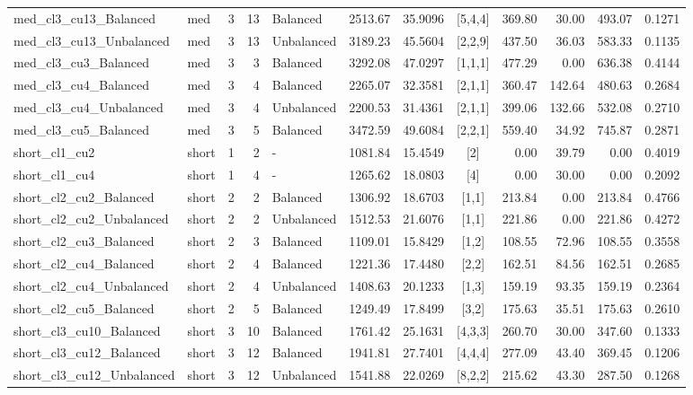 \documentclass[trsc,dblanonrev]{informs4}
\begin{document}
\begin{APPENDICES}
\begin{table}
{{\begin{tabular}{@{}l l r r l r r c r r r r@{}}
med\_cl3\_cu13\_Balanced & med & 3 & 13 & Balanced & 2513.67 & 35.9096 & [5,4,4] & 369.80 & 30.00 & 493.07 & 0.1271 \\
med\_cl3\_cu13\_Unbalanced & med & 3 & 13 & Unbalanced & 3189.23 & 45.5604 & [2,2,9] & 437.50 & 36.03 & 583.33 & 0.1135 \\
med\_cl3\_cu3\_Balanced & med & 3 & 3 & Balanced & 3292.08 & 47.0297 & [1,1,1] & 477.29 & 0.00 & 636.38 & 0.4144 \\
med\_cl3\_cu4\_Balanced & med & 3 & 4 & Balanced & 2265.07 & 32.3581 & [2,1,1] & 360.47 & 142.64 & 480.63 & 0.2684 \\
med\_cl3\_cu4\_Unbalanced & med & 3 & 4 & Unbalanced & 2200.53 & 31.4361 & [2,1,1] & 399.06 & 132.66 & 532.08 & 0.2710 \\
med\_cl3\_cu5\_Balanced & med & 3 & 5 & Balanced & 3472.59 & 49.6084 & [2,2,1] & 559.40 & 34.92 & 745.87 & 0.2871 \\
short\_cl1\_cu2 & short & 1 & 2 & - & 1081.84 & 15.4549 & [2] & 0.00 & 39.79 & 0.00 & 0.4019 \\
short\_cl1\_cu4 & short & 1 & 4 & - & 1265.62 & 18.0803 & [4] & 0.00 & 30.00 & 0.00 & 0.2092 \\
short\_cl2\_cu2\_Balanced & short & 2 & 2 & Balanced & 1306.92 & 18.6703 & [1,1] & 213.84 & 0.00 & 213.84 & 0.4766 \\
short\_cl2\_cu2\_Unbalanced & short & 2 & 2 & Unbalanced & 1512.53 & 21.6076 & [1,1] & 221.86 & 0.00 & 221.86 & 0.4272 \\
short\_cl2\_cu3\_Balanced & short & 2 & 3 & Balanced & 1109.01 & 15.8429 & [1,2] & 108.55 & 72.96 & 108.55 & 0.3558 \\
short\_cl2\_cu4\_Balanced & short & 2 & 4 & Balanced & 1221.36 & 17.4480 & [2,2] & 162.51 & 84.56 & 162.51 & 0.2685 \\
short\_cl2\_cu4\_Unbalanced & short & 2 & 4 & Unbalanced & 1408.63 & 20.1233 & [1,3] & 159.19 & 93.35 & 159.19 & 0.2364 \\
short\_cl2\_cu5\_Balanced & short & 2 & 5 & Balanced & 1249.49 & 17.8499 & [3,2] & 175.63 & 35.51 & 175.63 & 0.2610 \\
short\_cl3\_cu10\_Balanced & short & 3 & 10 & Balanced & 1761.42 & 25.1631 & [4,3,3] & 260.70 & 30.00 & 347.60 & 0.1333 \\
short\_cl3\_cu12\_Balanced & short & 3 & 12 & Balanced & 1941.81 & 27.7401 & [4,4,4] & 277.09 & 43.40 & 369.45 & 0.1206 \\
short\_cl3\_cu12\_Unbalanced & short & 3 & 12 & Unbalanced & 1541.88 & 22.0269 & [8,2,2] & 215.62 & 43.30 & 287.50 & 0.1268 \\

\end{tabular}}}
\end{table}
\end{APPENDICES}
\end{document}
